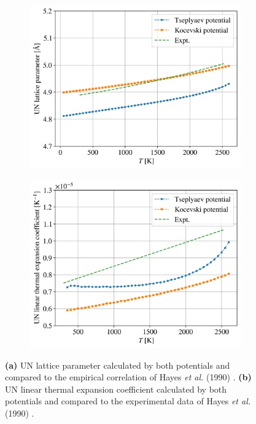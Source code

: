 \documentclass[preprint, 12pt]{elsarticle}
\begin{document}
\begin{figure}[h!]
\captionsetup{width=\textwidth}
\centering
\begin{subfigure}{0.4\textwidth}
    \includegraphics[width=\textwidth]{UNL.png}
    \caption{}
    \label{Fig:UNL}
\end{subfigure}
\begin{subfigure}{0.4\textwidth}
    \includegraphics[width=\textwidth]{UNLTEC.png}
    \caption{}
    \label{Fig:UNLTEC}
\end{subfigure}
\caption{\textbf{(a)} UN lattice parameter calculated by both potentials and compared to the empirical correlation of Hayes \textit{et al.} (1990) \cite{Hayes1990I}. \textbf{(b)} UN linear thermal expansion coefficient calculated by both potentials and compared to the experimental data of Hayes \textit{et al.} (1990) \cite{Hayes1990I}.}
\label{Fig:UNL-LTEC}
\end{figure}
\end{document}
